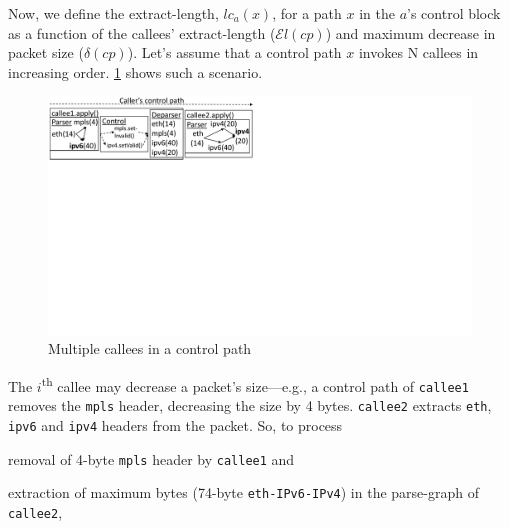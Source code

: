 \documentclass[letterpaper,twocolumn,10pt]{article}
\begin{document}

Now, we define the extract-length, $lc_{a}(x)$, for a path $x$ in the
\uprogram $a$'s control block as a function of the callees'
extract-length ($\mathcal{E}l(cp)$) and maximum decrease in packet
size ($\delta(cp)$). Let's assume that a control path $x$ invokes N
callees in increasing order. \cref{fig:sequential-callees} shows such
a scenario.
\begin{figure}[!tbp]
    \centering
    \includegraphics[trim=0 396 487 0, clip,scale=0.5]{sequential-callees}
    \caption{Multiple callees in a control path}
    \label{fig:sequential-callees}
\end{figure}
The $i$\textsuperscript{th} callee may decrease a packet's
size---e.g., a control path of \texttt{callee1} removes the
\texttt{mpls} header, decreasing the size by 4
bytes.  \texttt{callee2} extracts \texttt{eth}, \texttt{ipv6} and
\texttt{ipv4} headers from the packet. So, to
process
\begin{enumerate*}[label=(\roman*)]
  \item removal of 4-byte \texttt{mpls} header by \texttt{callee1} and
  \item extraction of maximum bytes (74-byte \texttt{eth-IPv6-IPv4})
    in the parse-graph of \texttt{callee2},
\end{enumerate*}
\end{document}
